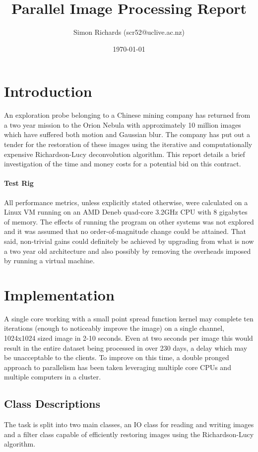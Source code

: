 \documentclass{article}
\title{Parallel Image Processing Report}
\date{\today}
\author{Simon Richards (scr52@uclive.ac.nz)}
\begin{document}
\maketitle
\section{Introduction}
An exploration probe belonging to a Chinese mining company has returned from a
two year mission to the Orion Nebula with  approximately 10 million images which
have suffered both motion and Gaussian blur. The company has put out a tender
for the restoration of these images using the iterative and computationally
expensive Richardson-Lucy deconvolution algorithm. This report details a brief
investigation of the time and money costs for a potential bid on this contract.

\paragraph{Test Rig}
All performance metrics, unless explicitly stated otherwise, were calculated on
a Linux VM running on an AMD Deneb quad-core 3.2GHz CPU with 8 gigabytes of
memory. The effects of running the program on other systems was not explored and
it was assumed that no order-of-magnitude change could be attained. That said,
non-trivial gains could definitely be achieved by upgrading from what is now a
two year old architecture and also possibly by removing the overheads imposed by running a
virtual machine.

\section{Implementation}
A single core working with a small point spread function kernel may complete ten
iterations (enough to noticeably improve the image) on a single channel,
1024x1024 sized image in 2-10 seconds. Even at two seconds per image this would
result in the entire dataset being processed in over 230 days, a delay which may
be unacceptable to the clients. To improve on this time, a double pronged
approach to parallelism has been taken leveraging multiple core CPUs and
multiple computers in a cluster.

\subsection{Class Descriptions}
The task is split into two main classes, an IO class for reading and writing
images and a filter class capable of efficiently restoring images using the
Richardson-Lucy algorithm.
\end{document}
